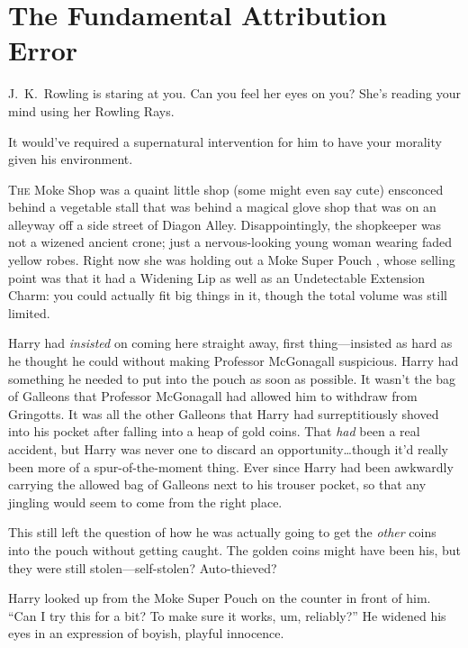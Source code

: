 \chapter{The Fundamental Attribution Error}

\begin{chapterOpeningAuthorNote}
J.~K.~Rowling is staring at you. Can you feel her eyes on you? She’s reading your mind using her Rowling Rays.
\end{chapterOpeningAuthorNote}
\begin{chapterOpeningQuote}
It would've required a supernatural intervention for him to have your morality given his environment.
\end{chapterOpeningQuote}

\lettrine{T}{he} Moke Shop was a quaint little shop (some might even say cute) ensconced behind a vegetable stall that was behind a magical glove shop that was on an alleyway off a side street of Diagon Alley. Disappointingly, the shopkeeper was not a wizened ancient crone; just a nervous-looking young woman wearing faded yellow robes. Right now she was holding out a Moke Super Pouch , whose selling point was that it had a Widening Lip as well as an Undetectable Extension Charm: you could actually fit big things in it, though the total volume was still limited.

Harry had \emph{insisted} on coming here straight away, first thing—insisted as hard as he thought he could without making Professor McGonagall suspicious. Harry had something he needed to put into the pouch as soon as possible. It wasn’t the bag of Galleons that Professor McGonagall had allowed him to withdraw from Gringotts. It was all the other Galleons that Harry had surreptitiously shoved into his pocket after falling into a heap of gold coins. That \emph{had} been a real accident, but Harry was never one to discard an opportunity…though it’d really been more of a spur-of-the-moment thing. Ever since Harry had been awkwardly carrying the allowed bag of Galleons next to his trouser pocket, so that any jingling would seem to come from the right place.

This still left the question of how he was actually going to get the \emph{other} coins into the pouch without getting caught. The golden coins might have been his, but they were still stolen—self-stolen? Auto-thieved?

Harry looked up from the Moke Super Pouch  on the counter in front of him.
“Can I try this for a bit? To make sure it works, um, reliably?” He widened his eyes in an expression of boyish, playful innocence.


